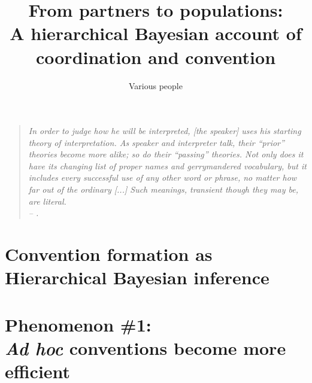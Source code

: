 \documentclass[11pt, floatsintext]{apa6}
\title{From partners to populations: \\[.1em] A hierarchical Bayesian account of coordination and convention}
\author{Various people}
\affiliation{Various Universities}
\begin{document}
\maketitle

\begin{quote}
\emph{In order to judge how he will be interpreted, [the speaker] uses his starting theory of interpretation. %
As speaker and interpreter talk, their ``prior'' theories become more alike; so do their ``passing'' theories. 
Not only does it have its changing list of proper names and gerrymandered vocabulary, but it includes every successful use of any other word or phrase, no matter how far out of the ordinary [...] 
Such meanings, transient though they may be, are literal. \\-- .}

\end{quote}



\section{Convention formation as\\ Hierarchical Bayesian inference}



\section{Phenomenon \#1: \\ \emph{Ad hoc} conventions become more efficient}
\end{document}
